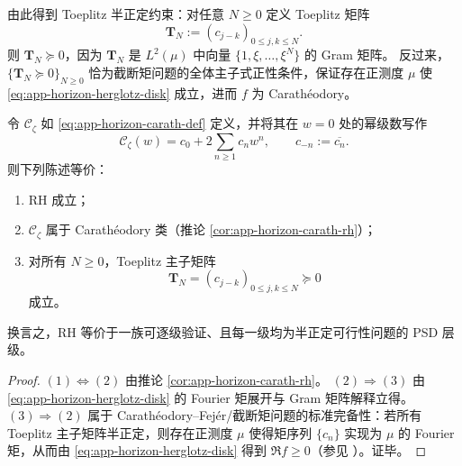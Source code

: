 由此得到 Toeplitz 半正定约束：对任意 \(N\ge 0\) 定义 Toeplitz 矩阵
\[
\mathbf{T}_N:=(c_{j-k})_{0\le j,k\le N}.
\]
则 \(\mathbf{T}_N\succeq 0\)，因为 \(\mathbf{T}_N\) 是 \(L^2(\mu)\) 中向量 \(\{1,\xi,\dots,\xi^N\}\) 的 Gram 矩阵。
反过来，\(\{\mathbf{T}_N\succeq 0\}_{N\ge 0}\) 恰为截断矩问题的全体主子式正性条件，保证存在正测度 \(\mu\) 使 \eqref{eq:app-horizon-herglotz-disk} 成立，进而 \(f\) 为 Carath\'eodory。

\begin{theorem}\label{thm:app-horizon-toeplitz-lmi}
令 \(\mathscr{C}_{\zeta}\) 如 \eqref{eq:app-horizon-carath-def} 定义，并将其在 \(w=0\) 处的幂级数写作
\[
\mathscr{C}_{\zeta}(w)=c_0+2\sum_{n\ge 1}c_n w^n,\qquad c_{-n}:=\overline{c_n}.
\]
则下列陈述等价：\vspace{-2pt}
\begin{enumerate}
  \item RH 成立；
  \item \(\mathscr{C}_{\zeta}\) 属于 Carath\'eodory 类（推论 \ref{cor:app-horizon-carath-rh}）；
  \item 对所有 \(N\ge 0\)，Toeplitz 主子矩阵
  \[
  \boxed{\;\mathbf{T}_N=(c_{j-k})_{0\le j,k\le N}\succeq 0\;}
  \]
  成立。
\end{enumerate}
换言之，RH 等价于一族可逐级验证、且每一级均为半正定可行性问题的 PSD 层级。
\end{theorem}

\begin{proof}
\((1)\Leftrightarrow(2)\) 由推论 \ref{cor:app-horizon-carath-rh}。
\((2)\Rightarrow(3)\) 由 \eqref{eq:app-horizon-herglotz-disk} 的 Fourier 矩展开与 Gram 矩阵解释立得。
\((3)\Rightarrow(2)\) 属于 Carath\'eodory--Fej\'er/截断矩问题的标准完备性：若所有 Toeplitz 主子矩阵半正定，则存在正测度 \(\mu\) 使得矩序列 \(\{c_n\}\) 实现为 \(\mu\) 的 Fourier 矩，从而由 \eqref{eq:app-horizon-herglotz-disk} 得到 \(\Re f\ge 0\)（参见 \cite{Duren1970TheoryHp,Simon2005OPUC1}）。证毕。
\end{proof}


